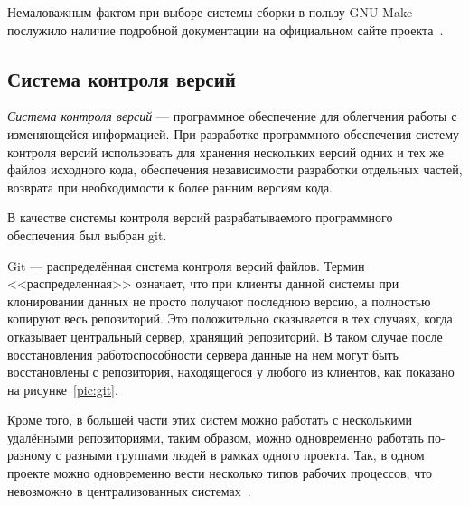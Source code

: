 Немаловажным фактом при выборе системы сборки в пользу GNU Make 
послужило наличие подробной документации на официальном сайте 
проекта~\cite{doc_make}.

\subsection{Система контроля версий}

\textit{Система контроля версий} --- программное обеспечение для облегчения
работы с изменяющейся информацией.
При разработке программного обеспечения систему контроля версий использовать
для хранения нескольких версий одних и тех же файлов исходного кода,
обеспечения независимости разработки отдельных частей,
возврата при необходимости к более ранним версиям кода.

В качестве системы контроля версий разрабатываемого программного обеспечения
был выбран git.

Git --- распределённая система контроля версий файлов.
Термин <<распределенная>> означает, что при клиенты данной системы при
клонировании данных не просто получают последнюю версию,
а полностью копируют весь репозиторий.
Это положительно сказывается в тех случаях, когда отказывает 
центральный сервер, хранящий репозиторий. 
В таком случае после восстановления работоспособности сервера данные
на нем могут быть восстановлены с репозитория,
находящегося у любого из клиентов, как показано на рисунке~\ref{pic:git}.

Кроме того, в большей части этих систем можно работать с несколькими
удалёнными репозиториями, таким образом, можно одновременно работать по-разному
с разными группами людей в рамках одного проекта.
Так, в одном проекте можно одновременно вести несколько типов рабочих процессов,
что невозможно в централизованных системах~\cite{doc_scm}.

